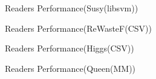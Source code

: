 \documentclass[sigconf,nonacm,screen]{acmart}
\begin{document}
    \begin{figure}[h]
        \centering
        
        \caption{Readers Performance(Susy(libsvm))}
    \end{figure}

    \begin{figure}[h]
        \centering
        
        \caption{Readers Performance(ReWasteF(CSV))}
    \end{figure}


    \begin{figure}[h]
        \centering
        
        \caption{Readers Performance(Higgs(CSV))}
    \end{figure}


    \begin{figure}[h]
        \centering
        
        \caption{Readers Performance(Queen(MM))}
    \end{figure}
\end{document}
